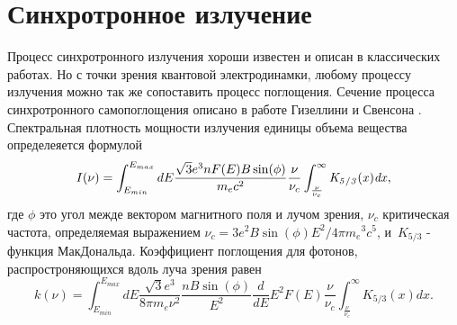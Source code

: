 \section{Синхротронное излучение}\label{synchrotronFormulaSection}
Процесс синхротронного излучения хороши известен и описан в классических работах. Но с точки зрения квантовой электродинамки, любому процессу излучения можно так же сопоставить процесс поглощения. Сечение процесса синхротронного самопоглощения описано в работе Гизеллини и Свенсона \cite{Ghisellini1991}. Спектральная плотность мощности излучения единицы объема вещества определеяется формулой
\begin{equation} \label{emission}
	I(\nu)=\int_{E_{min}}^{E_{max}} dE \frac {\sqrt {3}{e}^{3}n F(E) B \sin ( \phi)}{{m_e}{c}^{2}}
	\frac{\nu}{\nu_c}\int_{\frac {\nu}{\nu_c}}^{\infty }\it K_{5/3}(x)dx,
\end{equation}
где $\phi$ это угол межде вектором магнитного поля и лучом зрения, $\displaystyle\nu_{c}$ критическая частота, определяемая выражением $\displaystyle\nu_{c} = 3 e^{2} B \sin(\phi) E^{2}/4\pi {m_{e}}^{3} c^{5}$, и~$K_{5/3}$ - функция МакДональда.
Коэффициент поглощения для фотонов, распростроняющихся вдоль луча зрения равен
\begin{equation}\label{absorption}
	k(\nu)=\int_{E_{min}}^{E_{max}}dE\frac {\sqrt {3}{e}^{3}}{8\pi m_e \nu^2}\frac{n B\sin(\phi)}{E^2}
	\frac{d}{dE} E^2 F(E)\frac {\nu}{ \nu_c}\int_{\frac {\nu}{ \nu_c}}^{\infty }K_{5/3}(x) dx.
\end{equation}